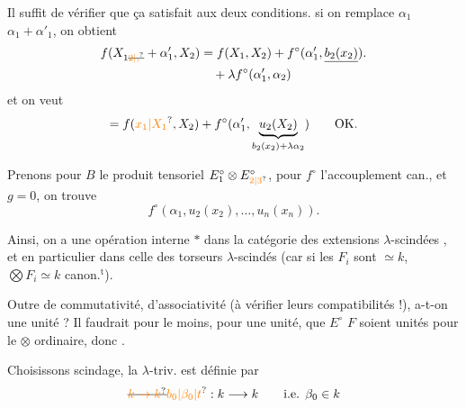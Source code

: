 Il suffit de vérifier que ça satisfait aux deux conditions.  si on remplace $\alpha_1$  $\alpha_1+\alpha'_1$, on obtient
\[
\begin{aligned}
f(X_{1\deleted{\unsure{2|,}}}+\alpha'_1,X_2)&=f(X_1,X_2)+f^\circ(\alpha'_1,\underline{b_2(x_2)}).\\
&\quad+\lambda f^\circ(\alpha'_1,\alpha_2)
\end{aligned}
\]
et on veut
\[
 = f(\unsure{x_1|X_1},X_2)+f^\circ(\alpha'_1,\underbrace{u_2(X_2)}_{b_2(x_2)+\lambda\alpha_2})\qquad \text{OK.}
\]

Prenons pour $B$ le produit tensoriel $E_1^\circ\otimes E_{\unsure{2|3}}^\circ$, pour $f^\circ$ l'accouplement can., et $g=0$, on trouve
\[
 f^\circ(\alpha_1,u_2(x_2),\ldots,u_n(x_n)).
\]

Ainsi, on a une opération interne $*$ dans la catégorie des extensions $\lambda$-scindées , et en particulier dans celle des torseurs $\lambda$-scindés (car si les $F_i$ sont $\simeq k$, $\bigotimes F_i\simeq k$ canon.$^{\mathrm t}$).

 Outre   de commutativité, d'associativité (à vérifier leurs compatibilités !), a-t-on une unité ? Il faudrait pour le moins,  pour une unité, 
que $E^\circ$  $F$ soient unités pour le $\otimes$ ordinaire, donc  .

 Choisissons scindage,  la $\lambda$-triv. est définie par
\[
 \deleted{\unsure{k\to k}}\unsure{b_0|\beta_0|t}:k\longrightarrow k\qquad\text{i.e. }\beta_0\in k
\]


